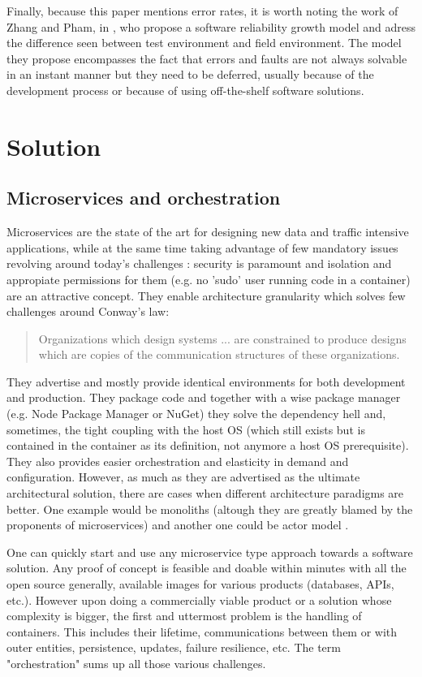 \documentclass[conference]{IEEEtran}
\begin{document}
    Finally, because this paper mentions error rates, it is worth noting the work of Zhang and Pham, in \cite{b2}, who propose a software reliability growth model and adress the difference seen between test environment and field environment. The model they propose encompasses the fact that errors and faults are not always solvable in an instant manner but they need to be deferred, usually because of the development process or because of using off-the-shelf software solutions.
    
\section{Solution}

\subsection{Microservices and orchestration}
    Microservices are the state of the art for designing new data and traffic intensive applications, while at the same time taking advantage of few mandatory issues revolving around today's challenges \cite{b5}: security is paramount and isolation and appropiate permissions for them (e.g. no 'sudo' user running code in a container) are an attractive concept. They enable architecture granularity which solves few challenges around Conway's law:
    
    \begin{quote}      
        Organizations which design systems ... are constrained to produce designs which are copies of the communication structures of these organizations. \cite{b4}
    \end{quote} They advertise and mostly provide identical environments for both development and production. They package code and together with a wise package manager (e.g. Node Package Manager or NuGet) they solve the dependency hell and, sometimes, the tight coupling with the host OS (which still exists but is contained in the container as its definition, not anymore a host OS prerequisite). They also provides easier orchestration and elasticity in demand and configuration. However, as much as they are advertised as the ultimate architectural solution, there are cases when different architecture paradigms are better. One example would be monoliths \cite{b6} (altough they are greatly blamed by the proponents of microservices) and another one could be actor model \cite{b7}.

    One can quickly start and use any microservice type approach towards a software solution. Any proof of concept is feasible and doable within minutes with all the open source generally, available images for various products (databases, APIs, etc.). However upon doing a commercially viable product or a solution whose complexity is bigger, the first and uttermost problem is the handling of containers. This includes their lifetime, communications between them or with outer entities, persistence, updates, failure resilience, etc. The term "orchestration" sums up all those various challenges.
    
\end{document}
